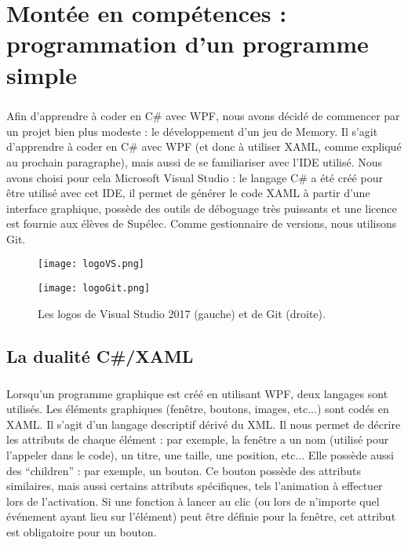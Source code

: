 \chapter{Montée en compétences : programmation d'un programme simple}

\paragraph{}Afin d'apprendre à coder en C\# avec WPF, nous avons décidé de commencer par un projet bien plus modeste : le développement d'un jeu de Memory. Il s'agit d'apprendre à coder en C\# avec WPF (et donc à utiliser XAML, comme expliqué au prochain paragraphe), mais aussi de se familiariser avec l'IDE utilisé. Nous avons choisi pour cela Microsoft Visual Studio : le langage C\# a été créé pour être utilisé avec cet IDE, il permet de générer le code XAML à partir d'une interface graphique, possède des outils de déboguage très puissants et une licence est fournie aux élèves de Supélec. Comme gestionnaire de versions, nous utilisons Git.

\begin{figure}[h]
	\begin{minipage}[t]{0.5\textwidth}
		\centering
		\texttt{[image: logoVS.png]}		
	\end{minipage}
	\begin{minipage}[t]{0.5\textwidth}
		\centering
		\texttt{[image: logoGit.png]}		
	\end{minipage}
	\caption{Les logos de Visual Studio 2017 (gauche) et de Git (droite).}
	\label{fig:logos}
\end{figure}


\section{La dualité C\#/XAML}

\paragraph{}Lorsqu'un programme graphique est créé en utilisant WPF, deux langages sont utilisés. Les éléments graphiques (fenêtre, boutons, images, etc...) sont codés en XAML. Il s'agit d'un langage descriptif dérivé du XML. Il nous permet de décrire les attributs de chaque élément : par exemple, la fenêtre a un nom (utilisé pour l'appeler dans le code), un titre, une taille, une position, etc... Elle possède aussi des \enquote{children} : par exemple, un bouton. Ce bouton possède des attributs similaires, mais aussi certains attributs spécifiques, tels l'animation à effectuer lors de l'activation. Si une fonction à lancer au clic (ou lors de n'importe quel événement ayant lieu sur l'élément) peut être définie pour la fenêtre, cet attribut est obligatoire pour un bouton.

